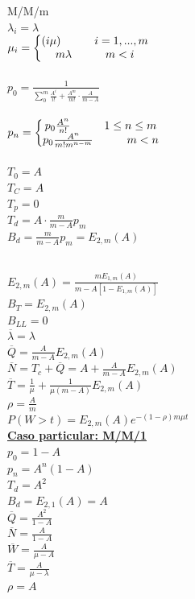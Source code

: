 \begin{minipage}{.22\textwidth}
	M/M/m \\
	$\lambda_i=\lambda$ \\
	$\mu_i = \left \{  \begin{matrix} (i\mu) \hskip 3em  i=1,...,m \\
			m\lambda \hskip 3em m<i\end{matrix}  \right .$ \\ \\
	$p_0 = \frac{1}{\sum_0^m{\frac{A^i}{i!}}+\frac{A^m}{m!}\cdot\frac{A}{m-A}}$ \\ \\
	$p_n = \left \{  \begin{matrix} p_0\frac{A^n}{n!} \hskip 3em 1\le{n}\le{m} \\
			p_0\frac{A^n}{m!m^{n-m}} \hskip 3em m<n\end{matrix}  \right .$ \\ \\
	$T_0=A$ \\
	$T_C=A$ \\
	$T_p=0$ \\
	$T_d=A\cdot{\frac{m}{m-A}{p_m}}$ \\
	$B_d=\frac{m}{m-A}{p_m} = E_{2,m}{(A)}$ \\ \\
\end{minipage}
\vfill\null
\columnbreak
\begin{minipage}{.22\textwidth}
	$E_{2,m}(A)=\frac{m{E_{1,m}(A)}}{m-A[1-{E_{1,m}(A)}]}$ \\
	$B_T=E_{2,m}(A)$ \\
	$B_{LL}=0$ \\
	$\overline{\lambda}=\lambda$ \\
	$\overline{Q}=\frac{A}{m-A}E_{2,m}(A)$ \\
	$\overline{N}=T_c+\overline{Q}=A+\frac{A}{m-A}E_{2,m}(A)$ \\
	$\overline{T}=\frac{1}{\mu}+\frac{1}{\mu(m-A)}E_{2,m}(A)$ \\
	$\rho=\frac{A}{m}$ \\
	$P(W > t) =E_{2,m}(A) e^{-(1-\rho)m\mu{t}}$ \\
	{\bf \underline{Caso particular: M/M/1}} \\
	$p_0=1-A$ \\
	$p_n=A^n(1-A)$ \\
	$T_d=A^2$ \\
	$B_d=E_{2,1}(A)=A$ \\
	$\overline{Q}=\frac{A^2}{1-A}$ \\
	$\overline{N}=\frac{A}{1-A}$ \\
	$\overline{W}=\frac{A}{\mu-A}$ \\
	$\overline{T}=\frac{A}{\mu-\lambda}$ \\
	$\rho=A$ \\
\end{minipage}
